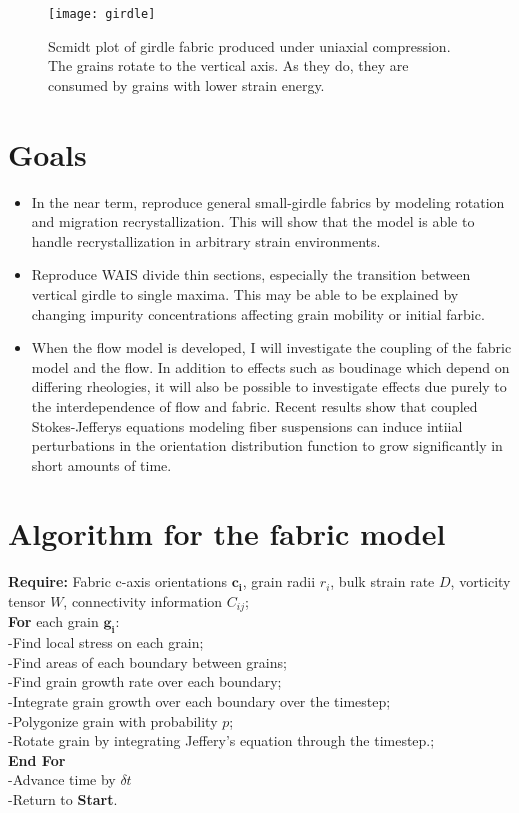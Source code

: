 \documentclass{article}
\begin{document}
\begin{figure}
\caption{Scmidt plot of girdle fabric produced under uniaxial compression. The grains rotate to the vertical axis. As they do, they are consumed by grains with lower strain energy.} 
\texttt{[image: girdle]}
\end{figure}
\section{Goals}
\begin{itemize}
\item In the near term, reproduce general small-girdle fabrics by modeling rotation and migration recrystallization. This will show that the model is able to handle recrystallization in arbitrary strain environments.

\item Reproduce WAIS divide thin sections, especially the transition between vertical girdle to single maxima. This may be able to be explained by changing impurity concentrations affecting grain mobility or initial farbic.

\item When the flow model is developed, I will investigate the coupling of the fabric model and the flow. In addition to effects such as boudinage which depend on differing rheologies, it will also be possible to investigate effects due purely to the interdependence of flow and fabric. Recent results \citep{montgomery-smith2011} show that coupled Stokes-Jefferys equations modeling fiber suspensions can induce intiial perturbations in the orientation distribution function to grow significantly in short amounts of time.

\end{itemize}


\appendix
\section{Algorithm for the fabric model}

\textbf{Require:} Fabric c-axis orientations $\mathbf{c_i}$, grain radii $r_i$, bulk strain rate $D$, vorticity tensor  $W$, connectivity information $C_{ij}$;
\\
\textbf{For} each grain $\mathbf{g_i}$:
\\
\intent -Find local stress on each grain;
\\
\indent -Find areas of each boundary between grains;
\\
\indent -Find grain growth rate over each boundary;
\\
\indent -Integrate grain growth over each boundary over the timestep;
\\
\indent -Polygonize grain with probability $p$;
\\
\indent -Rotate grain by integrating Jeffery's equation through the timestep.;
\\
\textbf{End For}
\\
-Advance time by $\delta t$
\\
-Return to \textbf{Start}.
\end{document}
